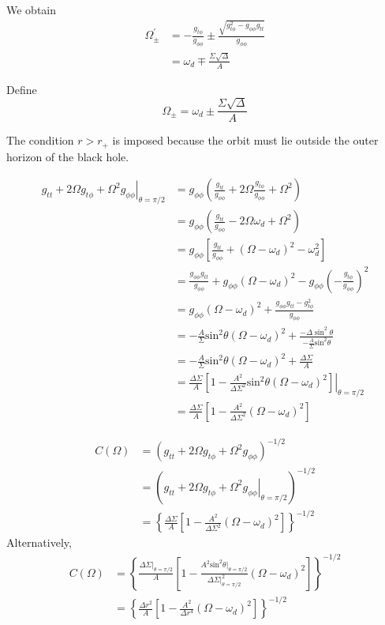 \documentclass[english]{article}
\begin{document}
We obtain 
\begin{align*}
\Omega^{'}_{\pm} & =-\frac{g_{t\phi}}{g_{\phi\phi}}\pm\frac{\sqrt{g^{2}_{t\phi}-g_{\phi\phi}g_{tt}}}{g_{\phi\phi}}\\
 & =\omega_{d}\mp\frac{\Sigma\sqrt{\Delta}}{A}
\end{align*}

Define 
\[
\Omega_{\pm}=\omega_{d}\pm\frac{\Sigma\sqrt{\Delta}}{A}
\]

The condition $r>r_{+}$ is imposed because the orbit must lie outside
the outer horizon of the black hole.

\begin{align*}
\left.g_{tt}+2\Omega g_{t\phi}+\Omega^{2}g_{\phi\phi}\right|_{\theta=\pi/2} & =g_{\phi\phi}\left(\frac{g_{tt}}{g_{\phi\phi}}+2\Omega\frac{g_{t\phi}}{g_{\phi\phi}}+\Omega^{2}\right)\\
 & =g_{\phi\phi}\left(\frac{g_{tt}}{g_{\phi\phi}}-2\Omega\omega_{d}+\Omega^{2}\right)\\
 & =g_{\phi\phi}\left[\frac{g_{tt}}{g_{\phi\phi}}+\left(\Omega-\omega_{d}\right)^{2}-\omega^{2}_{d}\right]\\
 & =\frac{g_{\phi\phi}g_{tt}}{g_{\phi\phi}}+g_{\phi\phi}\left(\Omega-\omega_{d}\right)^{2}-g_{\phi\phi}\left(-\frac{g_{t\phi}}{g_{\phi\phi}}\right)^{2}\\
 & =g_{\phi\phi}\left(\Omega-\omega_{d}\right)^{2}+\frac{g_{\phi\phi}g_{tt}-g^{2}_{t\phi}}{g_{\phi\phi}}\\
 & =-\frac{A}{\Sigma}\text{sin}^{2}\theta\left(\Omega-\omega_{d}\right)^{2}+\frac{-\Delta\sin^{2}\theta}{-\frac{A}{\Sigma}\text{sin}^{2}\theta}\\
 & =-\frac{A}{\Sigma}\text{sin}^{2}\theta\left(\Omega-\omega_{d}\right)^{2}+\frac{\Delta\Sigma}{A}\\
 & =\left.\frac{\Delta\Sigma}{A}\left[1-\frac{A^{2}}{\Delta\Sigma^{2}}\text{sin}^{2}\theta\left(\Omega-\omega_{d}\right)^{2}\right]\right|_{\theta=\pi/2}\\
 & =\frac{\Delta\Sigma}{A}\left[1-\frac{A^{2}}{\Delta\Sigma^{2}}\left(\Omega-\omega_{d}\right)^{2}\right]
\end{align*}

\begin{align*}
C\left(\Omega\right) & =\left(g_{tt}+2\Omega g_{t\phi}+\Omega^{2}g_{\phi\phi}\right)^{-1/2}\\
 & =\left(\left.g_{tt}+2\Omega g_{t\phi}+\Omega^{2}g_{\phi\phi}\right|_{\theta=\pi/2}\right)^{-1/2}\\
 & =\left\{ \frac{\Delta\Sigma}{A}\left[1-\frac{A^{2}}{\Delta\Sigma^{2}}\left(\Omega-\omega_{d}\right)^{2}\right]\right\} ^{-1/2}
\end{align*}
 Alternatively, 
\begin{align*}
C\left(\Omega\right) & =\left\{ \frac{\Delta\Sigma|_{\theta=\pi/2}}{A}\left[1-\frac{A^{2}\text{sin}^{2}\theta|_{\theta=\pi/2}}{\Delta\Sigma|^{2}_{\theta=\pi/2}}\left(\Omega-\omega_{d}\right)^{2}\right]\right\} ^{-1/2}\\
 & =\left\{ \frac{\Delta r^{2}}{A}\left[1-\frac{A^{2}}{\Delta r^{4}}\left(\Omega-\omega_{d}\right)^{2}\right]\right\} ^{-1/2}
\end{align*}
\end{document}
